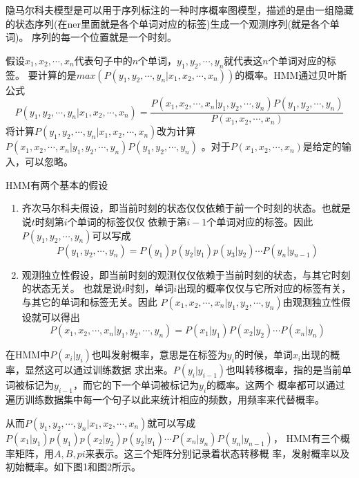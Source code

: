 \documentclass[openany,oneside]{ctexbook}
\begin{document}
隐马尔科夫模型是可以用于序列标注的一种时序概率图模型，描述的是由一组隐藏
的状态序列(在ner里面就是各个单词对应的标签)生成一个观测序列(就是各个单词)。
序列的每一个位置就是一个时刻。

假设$x_1,x_2,\cdots ,x_n$代表句子中的$n$个单词，$y_1,y_2,\cdots, y_n$就代表这$n$个单词对应的标签。
要计算的是$max(P(y_1,y_2,\cdots, y_n|x_1,x_2,\cdots,x_n))$的概率。HMM通过贝叶斯公式
\[
   P(y_1,y_2,\cdots, y_n|x_1,x_2,\cdots,x_n)=\displaystyle\frac{P(x_1,x_2,\cdots ,x_n|y_1,y_2,\cdots, y_n)P(y_1,y_2,\cdots, y_n)}{P(x_1,x_2,\cdots ,x_n)}
\]
将计算$P(y_1,y_2,\cdots, y_n|x_1,x_2,\cdots,x_n)$改为计算$P(x_1,x_2,\cdots ,x_n|y_1,y_2,\cdots, y_n)P(y_1,y_2,\cdots, y_n)$
。对于$P(x_1,x_2,\cdots ,x_n)$是给定的输入，可以忽略。

HMM有两个基本的假设
\begin{enumerate}
   \item 齐次马尔科夫假设，即当前时刻的状态仅仅依赖于前一个时刻的状态。也就是说$t$时刻第$i$个单词的标签仅仅
依赖于第$i-1$个单词对应的标签。因此$P(y_1,y_2,\cdots, y_n)$可以写成
\[
P(y_1,y_2,\cdots, y_n)=P(y_1)p(y_2|y_1)p(y_3|y_2)\cdots P(y_n|y_{n-1})
\]
   \item 观测独立性假设，即当前时刻的观测仅仅依赖于当前时刻的状态，与其它时刻的状态无关。
   也就是说$t$时刻，单词$i$出现的概率仅仅与它所对应的标签有关，与其它的单词和标签无关。因此
   $P(x_1,x_2,\cdots ,x_n|y_1,y_2,\cdots, y_n)$由观测独立性假设就可以得出
   \[
      P(x_1,x_2,\cdots ,x_n|y_1,y_2,\cdots, y_n)=P(x_1|y_1)P(x_2|y_2)\cdots P(x_n|y_n)
   \]

\end{enumerate}

在HMM中$P(x_i|y_i)$也叫发射概率，意思是在标签为$y_i$的时候，单词$x_i$出现的概率，显然这可以通过训练数据
求出来。$P(y_i|y_{i-1})$也叫转移概率，指的是当前单词被标记为$y_{i-1}$，而它的下一个单词被标记为$y_i$的概率。这两个
概率都可以通过遍历训练数据集中每一个句子以此来统计相应的频数，用频率来代替概率。

从而$P(y_1,y_2,\cdots, y_n|x_1,x_2,\cdots,x_n)$就可以写成$P(x_1|y_1)p(y_1)p(x_2|y_2)p(y_2|y_1)\cdots P(x_n|y_n)P(y_n|y_{n-1})$，
HMM有三个概率矩阵，用$A,B,pi$来表示。这三个矩阵分别记录着状态转移概
率，发射概率以及初始概率。如下图1和图2所示。
\end{document}
